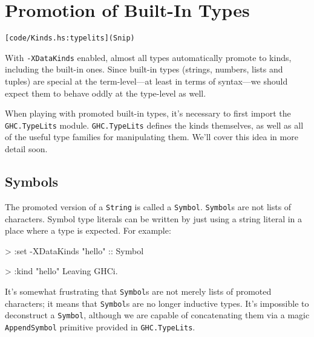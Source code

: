 \documentclass[
  11pt,
]{book}
\newenvironment{Shaded}{}{}
\newcommand{\DataTypeTok}[1]{\textcolor[rgb]{0.56,0.13,0.00}{#1}}
\newcommand{\NormalTok}[1]{#1}
\newcommand{\OperatorTok}[1]{\textcolor[rgb]{0.40,0.40,0.40}{#1}}
\newcommand{\OtherTok}[1]{\textcolor[rgb]{0.00,0.44,0.13}{#1}}
\newcommand{\StringTok}[1]{\textcolor[rgb]{0.25,0.44,0.63}{#1}}
\theoremstyle{nonumberplain}
\begin{document}
\hypertarget{promotion-of-built-in-types}{%
\section{Promotion of Built-In
Types}\label{promotion-of-built-in-types}}

\begin{verbatim}
[code/Kinds.hs:typelits](Snip)
\end{verbatim}

With \texttt{-XDataKinds} enabled, almost all types automatically
promote to kinds, including the built-in ones. Since built-in types
(strings, numbers, lists and tuples) are special at the term-level---at
least in terms of syntax---we should expect them to behave oddly at the
type-level as well.

When playing with promoted built-in types, it's necessary to first
import the \texttt{GHC.TypeLits} module. \texttt{GHC.TypeLits} defines
the kinds themselves, as well as all of the useful type families for
manipulating them. We'll cover this idea in more detail soon.

\hypertarget{symbols}{%
\subsection{Symbols}\label{symbols}}

The promoted version of a \texttt{String} is called a \texttt{Symbol}.
\texttt{Symbol}s are not lists of characters. Symbol type literals can
be written by just using a string literal in a place where a type is
expected. For example:

\begin{Shaded}
\begin{Highlighting}[]
\OperatorTok{\textgreater{}} \OperatorTok{:}\NormalTok{set }\OperatorTok{{-}}\DataTypeTok{XDataKinds}
\StringTok{"hello"}\OtherTok{ ::} \DataTypeTok{Symbol}


\OperatorTok{\textgreater{}} \OperatorTok{:}\NormalTok{kind }\StringTok{"hello"}
\DataTypeTok{Leaving} \DataTypeTok{GHCi}\OperatorTok{.}
\end{Highlighting}
\end{Shaded}

It's somewhat frustrating that \texttt{Symbol}s are not merely lists of
promoted characters; it means that \texttt{Symbol}s are no longer
inductive types. It's impossible to deconstruct a \texttt{Symbol},
although we are capable of concatenating them via a magic
\texttt{AppendSymbol} primitive provided in \texttt{GHC.TypeLits}.
\end{document}
